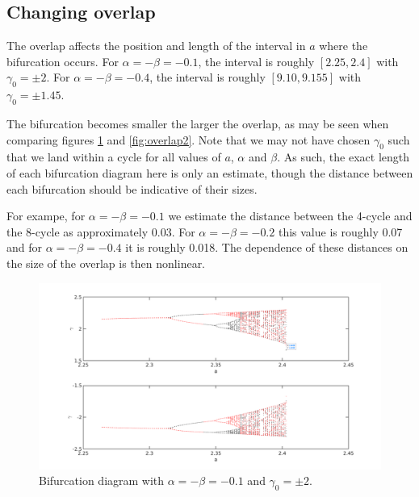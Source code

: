 \documentclass{article}
\begin{document}
\subsection{Changing overlap}

The overlap affects the position and length of the interval in $a$ where the bifurcation occurs.
For $\alpha = -\beta = -0.1$, the interval is roughly $[2.25,2.4]$ with $\gamma_0 = \pm 2$.
For $\alpha = -\beta = -0.4$, the interval is roughly $[9.10,9.155]$ with $\gamma_0 = \pm 1.45$.

The bifurcation becomes smaller the larger the overlap, as may be seen when comparing figures \ref{fig:overlap1} and \ref{fig:overlap2}.
Note that we may not have chosen $\gamma_0$ such that we land within a cycle for all values of $a$, $\alpha$ and $\beta$.
As such, the exact length of each bifurcation diagram here is only an estimate, though the distance between each bifurcation should be indicative of their sizes.

For exampe, for $\alpha = -\beta = -0.1$ we estimate the distance between the 4-cycle and the 8-cycle as approximately 0.03.
For $\alpha = -\beta = -0.2$ this value is roughly 0.07 and for $\alpha = -\beta = -0.4$ it is roughly 0.018.
The dependence of these distances on the size of the overlap is then nonlinear.

\begin{figure}
\includegraphics[width=\textwidth]{bifurcation_overlap1.png}
\caption{Bifurcation diagram with $\alpha = -\beta = -0.1$ and $\gamma_0 = \pm 2$.}
\label{fig:overlap1}
\end{figure}
\end{document}
